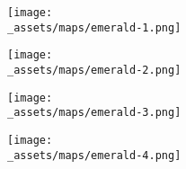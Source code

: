 \begin{minipage}{0.4\paperwidth}
  \centering
  \texttt{[image: \\\_assets/maps/emerald-1.png]}
\end{minipage}
\begin{minipage}{0.4\paperwidth}
  \centering
  \texttt{[image: \\\_assets/maps/emerald-2.png]}
\end{minipage}
\linebreak
\begin{minipage}{0.4\paperwidth}
  \centering
  \texttt{[image: \\\_assets/maps/emerald-3.png]}
\end{minipage}
\begin{minipage}{0.4\paperwidth}
  \centering
  \texttt{[image: \\\_assets/maps/emerald-4.png]}
\end{minipage}
